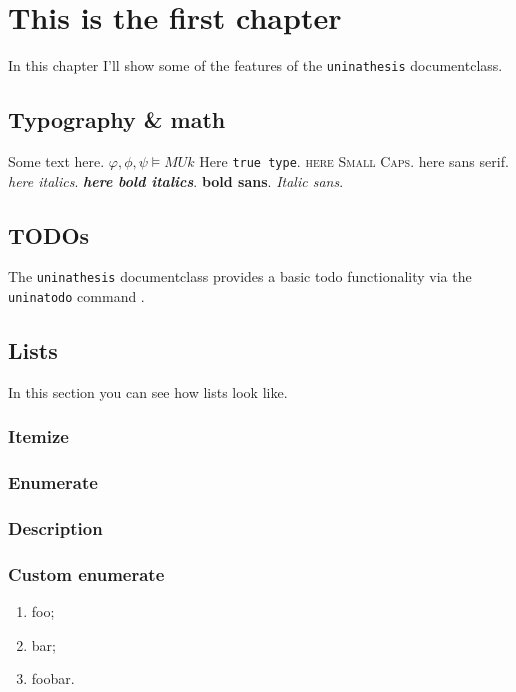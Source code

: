 \chapter{This is the first chapter}\label{chap:first}

\inlineminitoc

\noindent In this chapter I'll show some of the features of the \texttt{uninathesis} documentclass.

\section{Typography \& math}
Some text here. \(\varphi,\phi,\psi\vDash M U k\)
Here \texttt{true type}. 
\textsc{here Small Caps}. 
\textsf{here sans serif}. 
\emph{here italics}.
\textbf{\emph{here bold italics}}.
\textbf{\textsf{bold sans}}.
\textsf{\emph{Italic sans}}.
\blindmathpaper

\section{TODOs}
The \texttt{uninathesis} documentclass provides a basic todo functionality via 
the \texttt{uninatodo} command . 

\section{Lists}
In this section you can see how lists look like.
\subsection{Itemize}
\blinditemize
\subsection{Enumerate}
\blindenumerate
\subsection{Description}
\blinddescription
\subsection{Custom enumerate}
\begin{enumerate}[label=(\roman*)]
    \item foo;
    \item bar;
    \item foobar.
\end{enumerate}
